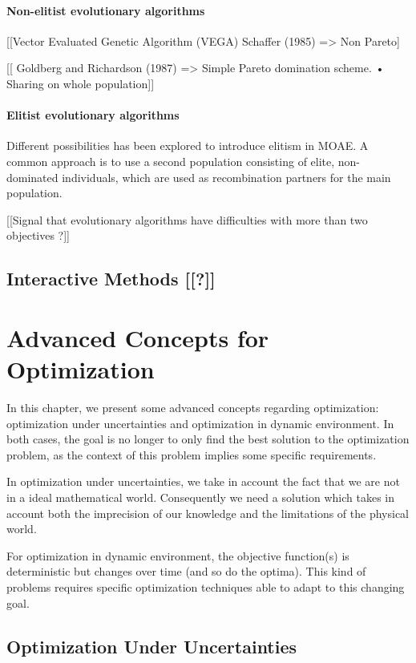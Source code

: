 \subsubsection{Non-elitist evolutionary algorithms}

[[Vector Evaluated Genetic Algorithm (VEGA) Schaffer (1985) => Non Pareto]

[[  Goldberg and Richardson (1987) =>  Simple Pareto domination scheme. • Sharing on whole population]]


\subsubsection{Elitist evolutionary algorithms}

Different possibilities has been explored to introduce elitism in MOAE. A common approach is to use a second population consisting of elite, non-dominated individuals, which are used as recombination partners for the main population.

[[Signal that evolutionary algorithms have difficulties with more than two objectives ?]]

\section{Interactive Methods [[?]]}

\chapter{Advanced Concepts for Optimization}

In this chapter, we present some advanced concepts regarding optimization: optimization under uncertainties and optimization in dynamic environment. In both cases, the goal is no longer to only find the best solution to the optimization problem, as the context of this problem implies some specific requirements.

In optimization under uncertainties, we take in account the fact that we are not in a ideal mathematical world. Consequently we need a solution which takes in account both the imprecision of our knowledge and the limitations of the physical world.

For optimization in dynamic environment, the objective function(s) is deterministic but changes over time (and so do the optima). This kind of problems requires specific optimization techniques able to adapt to this changing goal.

\section{Optimization Under Uncertainties}

